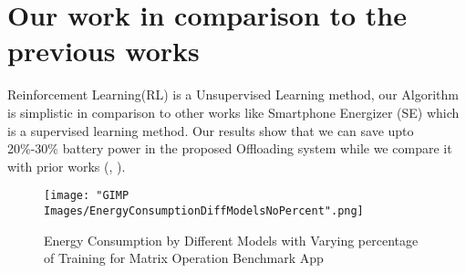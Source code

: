 \documentclass[12pt, twocolumn]{report}
\begin{document}
\section{Our work in comparison to the previous works}
Reinforcement Learning(RL) is a Unsupervised Learning method, our Algorithm is simplistic in comparison to other works like Smartphone Energizer (SE) \cite{khairy2013smartphone} which is a supervised learning method. Our results show that we can save upto 20\%-30\% battery power in the proposed Offloading system while we compare it with prior works (\cite{khairy2013smartphone}, \cite{flores2013adaptive}). 
\begin{figure}[h]
  \centering
  \texttt{[image: "GIMP Images/EnergyConsumptionDiffModelsNoPercent".png]}
  \caption{Energy Consumption by Different Models with Varying percentage of Training for Matrix Operation Benchmark App}
  \label{fig:EnergyConsumptionDiffModelsNoPercent}
\end{figure}


\end{document}
